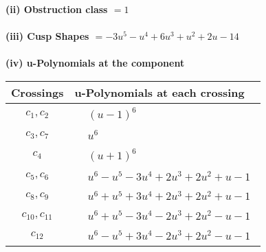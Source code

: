 \documentclass[1p]{elsarticle_modified}
\theoremstyle{definition}
\begin{document}
\flushleft \textbf{(ii) Obstruction class $= 1$}\\~\\
\flushleft \textbf{(iii) Cusp Shapes $= -3 u^5- u^4+6 u^3+u^2+2 u-14$}\\~\\
\newpage\renewcommand{\arraystretch}{1}
\flushleft \textbf{(iv) u-Polynomials at the component}\newline \\
\begin{tabular}{m{50pt}|m{274pt}}
Crossings & \hspace{64pt}u-Polynomials at each crossing \\
\hline $$\begin{aligned}c_{1},c_{2}\end{aligned}$$&$\begin{aligned}
&(u-1)^6
\end{aligned}$\\
\hline $$\begin{aligned}c_{3},c_{7}\end{aligned}$$&$\begin{aligned}
&u^6
\end{aligned}$\\
\hline $$\begin{aligned}c_{4}\end{aligned}$$&$\begin{aligned}
&(u+1)^6
\end{aligned}$\\
\hline $$\begin{aligned}c_{5},c_{6}\end{aligned}$$&$\begin{aligned}
&u^6- u^5-3 u^4+2 u^3+2 u^2+u-1
\end{aligned}$\\
\hline $$\begin{aligned}c_{8},c_{9}\end{aligned}$$&$\begin{aligned}
&u^6+u^5+3 u^4+2 u^3+2 u^2+u-1
\end{aligned}$\\
\hline $$\begin{aligned}c_{10},c_{11}\end{aligned}$$&$\begin{aligned}
&u^6+u^5-3 u^4-2 u^3+2 u^2- u-1
\end{aligned}$\\
\hline $$\begin{aligned}c_{12}\end{aligned}$$&$\begin{aligned}
&u^6- u^5+3 u^4-2 u^3+2 u^2- u-1
\end{aligned}$\\
\hline
\end{tabular}\\~\\
\end{document}
